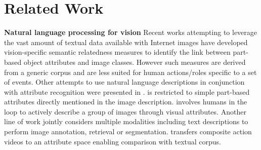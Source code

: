 \documentclass[10pt,twocolumn,letterpaper]{article}
\begin{document}

\section{Related Work}
\noindent \textbf{Natural language processing for vision} 
Recent works attempting to leverage the vast amount of textual data available with Internet images have 
developed vision-specific semantic relatedness measures \cite{Rohrbach_CVPR10, Rohrbach_ECCV10} 
to identify the link between part-based object attributes and image classes. 
However such measures are derived from a generic corpus and are less suited for human actions/roles specific to a set of events. 
Other attempts to use natural language descriptions in conjunction with attribute recognition were 
presented in \cite{Berg_ECCV10, Parikh_CVPR11}. 
\cite{Berg_ECCV10} is restricted to simple part-based attributes directly mentioned in the image description. 
\cite{Parikh_CVPR11} involves humans in the loop to actively describe a group of images through visual attributes. 
Another line of work \cite{Jia_ICCV11, Socher_CVPR10} jointly considers multiple modalities including text descriptions to perform image annotation, retrieval or segmentation. 
\cite{Rohrbach_ECCV12}  transfers composite action videos to an attribute space enabling comparison with textual corpus. %
\end{document}
